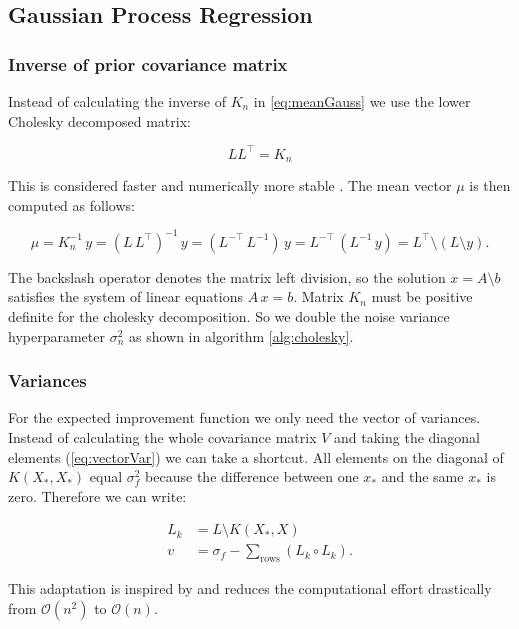 \subsection{Gaussian Process Regression}

\subsubsection{Inverse of prior covariance matrix}

Instead of calculating the inverse of $K_n$ in \eqref{eq:meanGauss} we use the lower Cholesky decomposed matrix:

$$LL^\top=K_n$$

This is considered faster and numerically more stable \cite{rasmussen2006gaussian}. The mean vector $\mu$ is then computed as follows:

\begin{equation} \label{eq:regression}
    \mu = K_n^{-1}\,y = (L\,L^{\top})^{-1}\,y = (L^{-\top}\,L^{-1})\,y = L^{-\top}\,(L^{-1}\,y) = L^{\top}\setminus(L \setminus y).
\end{equation}

The backslash operator denotes the matrix left division, so the solution $x=A\setminus b$ satisfies the system of linear equations $A\,x=b$.
Matrix $K_n$ must be positive definite for the cholesky decomposition. So we double the noise variance hyperparameter $\sigma_n^2$ as shown in algorithm \ref{alg:cholesky}.

\subsubsection{Variances}

For the expected improvement function we only need the vector of variances. Instead of calculating the whole covariance matrix $V$ and taking the diagonal elements (\ref{eq:vectorVar}) we can take a shortcut. All elements on the diagonal of $K(X_*,X_*)$ equal $\sigma_f^2$ because the difference between one $x_*$ and the same $x_*$ is zero. Therefore we can write:

\begin{align}
    L_k &= L \setminus K(X_*,X) \\
    v &= \sigma_f - \sum_{\text{rows}} (L_k \circ L_k). \label{eq:vectorvar}
\end{align}

This adaptation is inspired by \cite{nandoCode} and reduces the computational effort drastically from $\mathcal{O}(n^2)$ to $\mathcal{O}(n)$.

